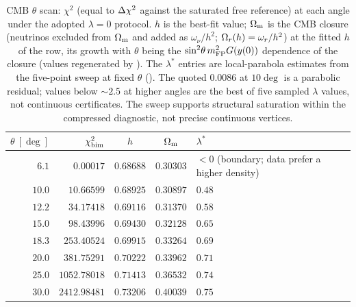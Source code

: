 \begin{table}[h]
\centering\small
\caption{CMB $\theta$ scan: $\chi^2$ (equal to $\Delta\chi^2$ against the saturated free reference) at each angle under the adopted $\lambda=0$ protocol. $h$ is the best-fit value; $\Omega_{\mathrm m}$ is the CMB closure (neutrinos excluded from $\Omega_{\mathrm m}$ and added as $\omega_\nu/h^2$; $\Omega_{r}(h)=\omega_r/h^2$) at the fitted $h$ of the row, its growth with $\theta$ being the $\sin^2\!\theta\,m_{\mathrm{FP}}^2G(y(0))$ dependence of the closure (values regenerated by ). The $\lambda^*$ entries are local-parabola estimates from the five-point sweep at fixed $\theta$ (). The quoted $0.0086$ at $10\deg$ is a parabolic residual; values below $\sim2.5$ at higher angles are the best of five sampled $\lambda$ values, not continuous certificates. The sweep supports structural saturation within the compressed diagnostic, not precise continuous vertices.}\label{tab:A5}
\begin{tabular}{@{}rrccl@{}}
\toprule
$\theta\ [\deg]$ & $\chi^2_{\rm bim}$ & $h$ & $\Omega_{\mathrm m}$ & $\lambda^*$\\
\midrule
$6.1$ & $0.00017$ & $0.68688$ & $0.30303$ & $<0$ (boundary; data prefer a higher density)\\
$10.0$ & $10.66599$ & $0.68925$ & $0.30897$ & $0.48$\\
$12.2$ & $34.17418$ & $0.69116$ & $0.31370$ & $0.58$\\
$15.0$ & $98.43996$ & $0.69430$ & $0.32128$ & $0.65$\\
$18.3$ & $253.40524$ & $0.69915$ & $0.33264$ & $0.69$\\
$20.0$ & $381.75291$ & $0.70222$ & $0.33962$ & $0.71$\\
$25.0$ & $1052.78018$ & $0.71413$ & $0.36532$ & $0.74$\\
$30.0$ & $2412.98481$ & $0.73206$ & $0.40039$ & $0.75$\\
\bottomrule
\end{tabular}
\end{table}

